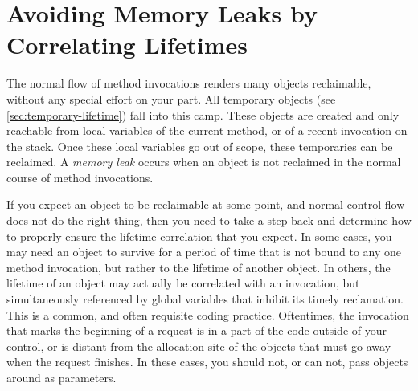 



\chapter{Avoiding Memory Leaks by Correlating Lifetimes}
\label{chapter:lifetime-implementation-strategies}

The normal flow of method invocations renders many objects reclaimable, without
any special effort on your part. All temporary objects (see
\autoref{sec:temporary-lifetime}) fall into this camp. These objects are created
and only reachable from local variables of the current method, or of a recent
invocation on the stack. Once these local variables go out of scope, these
temporaries can be reclaimed. A \emph{memory leak} occurs when an object is not
reclaimed in the normal course of method invocations.

If you expect an object to be reclaimable at some point, and normal control flow
does not do the right thing, then you need to take a step back and determine how
to properly ensure the lifetime correlation that you expect.
In some cases, you may need an object to survive for a period of time that is
not bound to any one method invocation, but rather to the lifetime of another
object. In others, the lifetime of an object may actually be correlated with an
invocation, but simultaneously referenced by global variables that inhibit its
timely reclamation. This is a common, and often requisite coding practice.
Oftentimes, the invocation that marks the beginning of a request is in a part of the code
outside of your control, or is distant from the allocation site of the objects
that must go away when the request finishes. In these cases, you should not, or
can not, pass objects around as parameters.

